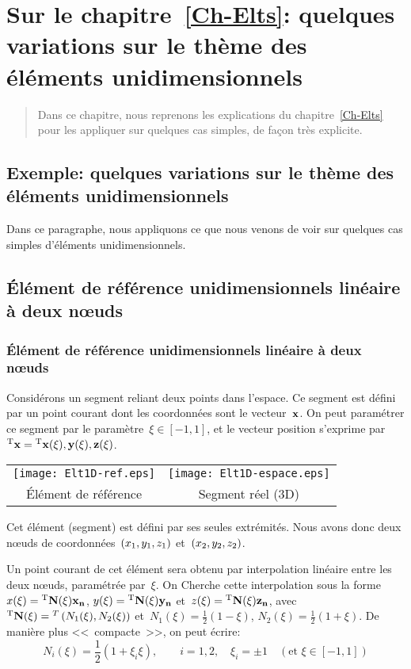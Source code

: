 \ifVersionAvecExemplesSepares
  \chapter{Sur le chapitre~\ref{Ch-Elts}: quelques variations sur le thème des éléments unidimensionnels}
  \begin{abstract}
  Dans ce chapitre, nous reprenons les explications du chapitre~\ref{Ch-Elts} pour les appliquer
  sur quelques cas simples, de façon très explicite.
  \end{abstract}
\else
  \section{Exemple: quelques variations sur le thème des éléments unidimensionnels}

  Dans ce paragraphe, nous appliquons ce que nous venons de voir sur quelques cas simples d'éléments unidimensionnels.
\fi

\medskipvm
\ifVersionAvecExemplesSepares
  \section{Élément de référence unidimensionnels linéaire à deux nœuds}\label{Sec-Elt1D2}
\else
  \subsection{Élément de référence unidimensionnels linéaire à deux nœuds}\label{Sec-Elt1D2}
\fi

Considérons un segment reliant deux points dans l'espace.
Ce segment est défini par un point courant dont les coordonnées sont le vecteur~$\VV{x}$.
On peut paramétrer ce segment par le paramètre~$\xi \in [-1,1]$, et le vecteur
position s'exprime par~${}^\mathrm{T}\mathbf{x}={}^\mathrm{T}\mathbf{x(\xi), y(\xi), z(\xi)}$.
\begin{table}[ht]\centering\small
\begin{tabular}{cc}
\texttt{[image: Elt1D-ref.eps]} &
\texttt{[image: Elt1D-espace.eps]} \\
Élément de référence & Segment réel (3D)
\end{tabular}
\end{table}
\ifVersionDuDocEstVincent

\medskipvm\fi
Cet élément (segment) est défini par ses seules extrémités. Nous avons donc deux
nœuds de coordonnées~$\left(x_1, y_1, z_1\right)$ et~$\left(x_2, y_2, z_2\right)$.\ifVersionDuDocEstVincent\par\fi
Un point courant de cet élément sera obtenu par interpolation linéaire entre les deux nœuds,
paramétrée par~$\xi$. On Cherche cette interpolation sous la forme~$x(\xi)=\LL{N(\xi)}\VV{x_n}$, $y(\xi)=\LL{N(\xi)}\VV{y_n}$ et~$z(\xi)=\LL{N(\xi)}\VV{z_n}$, avec
${}^\mathrm{T}\mathbf{N(\xi)}={}^T\left( N_1(\xi), N_2(\xi)\right)$ et~$N_1(\xi)=\frac12 (1-\xi)$, $N_2(\xi)=\frac12(1+\xi)$.
De manière plus <<~compacte~>>, on peut écrire:
\begin{equation} N_i(\xi)=\frac12(1+\xi_i\xi), \qquad i=1,2, \quad \xi_i=\pm1 \quad (\text{et } \xi\in[-1,1]) \end{equation}
\ifVersionDuDocEstVincent


